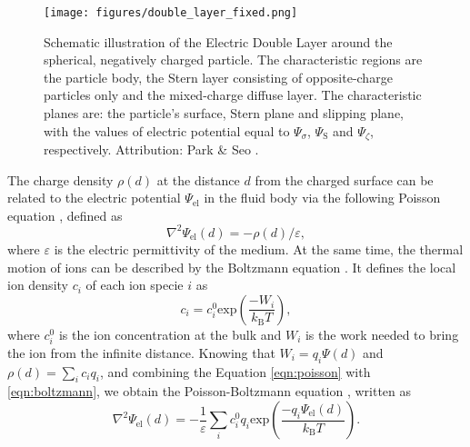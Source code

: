 \documentclass{master_thesis}
\begin{document}
\begin{figure}[ht]
    \centering
    \texttt{[image: figures/double\_layer\_fixed.png]}
    \caption{Schematic illustration of the Electric Double Layer around the spherical, negatively charged particle. The characteristic regions are the particle body, the Stern layer consisting of opposite-charge particles only and the mixed-charge diffuse layer. The characteristic planes are: the particle's surface, Stern plane and slipping plane, with the values of electric potential equal to $\Psi_{\sigma}$, $\Psi_{\textrm{S}}$ and $\Psi_\zeta$, respectively. Attribution: Park \& Seo \cite{park_2011}.}
    \label{fig:double_layer}
\end{figure}

The charge density $\rho(d)$ at the distance $d$ from the charged surface can be related to the electric potential $\Psi_{\textrm{el}}$ in the fluid body via the following Poisson equation \cite{andelman_2006}, defined as
\begin{equation}
\nabla^2 \Psi_{\textrm{el}}(d) = -\rho(d)/\varepsilon,
\label{eqn:poisson}
\end{equation}
where $\varepsilon$ is the electric permittivity of the medium. At the same time, the thermal motion of ions can be described by the Boltzmann equation \cite{wikipedia_pb}. It defines the local ion density $c_i$ of each ion specie $i$ as
\begin{equation}
    c_i = c_i^0 \textrm{exp}\left( \frac{-W_i}{k_{\textrm{B}}T} \right),
\label{eqn:boltzmann}
\end{equation}
where $c_i^0$ is the ion concentration at the bulk and $W_i$ is the work needed to bring the ion from the infinite distance. Knowing that $W_i=q_i \Psi(d)$ and $\rho(d)=\sum_i c_iq_i$, and combining the Equation \eqref{eqn:poisson} with \eqref{eqn:boltzmann}, we obtain the Poisson-Boltzmann equation \cite{butt_2003}, written as
\begin{equation}
    \nabla^2 \Psi_{\textrm{el}}(d) = -\frac{1}{\varepsilon} \sum_i c_i^0 q_i \textrm{exp} \left( \frac{-q_i \Psi_{\textrm{el}}(d)}{k_{\textrm{B}}T} \right).
\end{equation}
\end{document}
